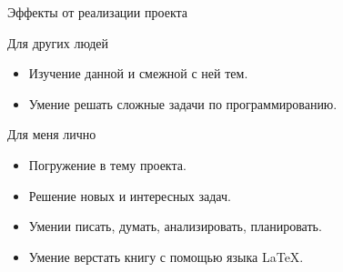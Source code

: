 \documentclass[8pt]{beamer}%
\begin{document}
	\begin{frame}{Эффекты от реализации проекта}
		\begin{block}{Для других людей}
			\begin{itemize}
				\item Изучение данной и смежной с ней тем.
				\item Умение решать сложные задачи по программированию.
			\end{itemize}
		\end{block}
	
		\begin{block}{Для меня лично}
			\begin{itemize}
				\item Погружение в тему проекта.
				\item Решение новых и интересных задач.
				\item Умении писать, думать, анализировать, планировать.
				\item Умение верстать книгу с помощью языка \LaTeX.
			\end{itemize}
		\end{block}
	\end{frame}
\end{document}
